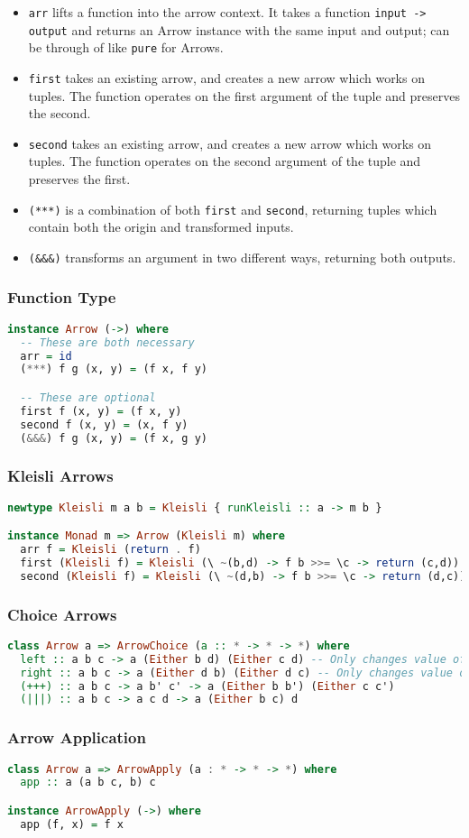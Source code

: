 \begin{itemize}
  \item \texttt{arr} lifts a function into the arrow context. It takes a function \texttt{input -> output} and returns an Arrow instance with the same input and output; can be through of like \texttt{pure} for Arrows.
  \item \texttt{first} takes an existing arrow, and creates a new arrow which works on tuples. The function operates on the first argument of the tuple and preserves the second.
  \item \texttt{second} takes an existing arrow, and creates a new arrow which works on tuples. The function operates on the second argument of the tuple and preserves the first.
  \item \texttt{(***)} is a combination of both \texttt{first} and \texttt{second}, returning tuples which contain both the origin and transformed inputs.
  \item \texttt{(\&\&\&)} transforms an argument in two different ways, returning both outputs.
\end{itemize}

\subsubsection{Function Type}
\begin{lstlisting}[language=haskell]
instance Arrow (->) where
  -- These are both necessary
  arr = id
  (***) f g (x, y) = (f x, f y)

  -- These are optional
  first f (x, y) = (f x, y)
  second f (x, y) = (x, f y)
  (&&&) f g (x, y) = (f x, g y)
\end{lstlisting}

\subsubsection{Kleisli Arrows}
\begin{lstlisting}[language=haskell]
newtype Kleisli m a b = Kleisli { runKleisli :: a -> m b }

instance Monad m => Arrow (Kleisli m) where
  arr f = Kleisli (return . f)
  first (Kleisli f) = Kleisli (\ ~(b,d) -> f b >>= \c -> return (c,d))
  second (Kleisli f) = Kleisli (\ ~(d,b) -> f b >>= \c -> return (d,c))
\end{lstlisting}

\subsubsection{Choice Arrows}
\begin{lstlisting}[language=haskell]
class Arrow a => ArrowChoice (a :: * -> * -> *) where
  left :: a b c -> a (Either b d) (Either c d) -- Only changes value of the Left constructor
  right :: a b c -> a (Either d b) (Either d c) -- Only changes value of the Right constructor
  (+++) :: a b c -> a b' c' -> a (Either b b') (Either c c')
  (|||) :: a b c -> a c d -> a (Either b c) d
\end{lstlisting}

\subsubsection{Arrow Application}
\begin{lstlisting}[language=haskell]
class Arrow a => ArrowApply (a : * -> * -> *) where
  app :: a (a b c, b) c

instance ArrowApply (->) where
  app (f, x) = f x
\end{lstlisting}